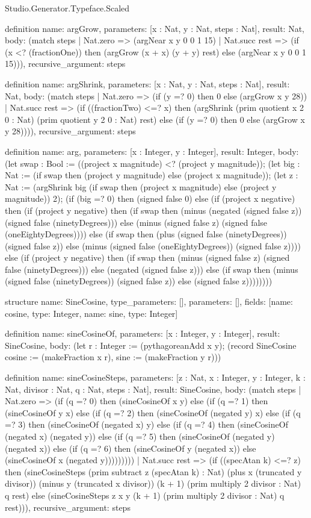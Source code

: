 \begin{lexlean}{Studio.Generator.Typeface.Scaled}
\begin{semanticmodule}
definition{
  name: argGrow,
  parameters: [x : Nat, y : Nat, steps : Nat],
  result: Nat,
  body: (match steps
    | Nat.zero => (argNear x y 0 0 1 15)
    | Nat.succ rest => (if (x <? (fractionOne)) then (argGrow (x + x) (y + y) rest) else (argNear x y 0 0 1 15))),
  recursive_argument: steps
}

definition{
  name: argShrink,
  parameters: [x : Nat, y : Nat, steps : Nat],
  result: Nat,
  body: (match steps
    | Nat.zero => (if (y =? 0) then 0 else (argGrow x y 28))
    | Nat.succ rest => (if ((fractionTwo) <=? x) then (argShrink (prim quotient x 2 0 : Nat) (prim quotient y 2 0 : Nat) rest) else (if (y =? 0) then 0 else (argGrow x y 28)))),
  recursive_argument: steps
}

definition{
  name: arg,
  parameters: [x : Integer, y : Integer],
  result: Integer,
  body: (let swap : Bool := ((project x magnitude) <? (project y magnitude)); (let big : Nat := (if swap then (project y magnitude) else (project x magnitude)); (let z : Nat := (argShrink big (if swap then (project x magnitude) else (project y magnitude)) 2); (if (big =? 0) then (signed false 0) else (if (project x negative) then (if (project y negative) then (if swap then (minus (negated (signed false z)) (signed false (ninetyDegrees))) else (minus (signed false z) (signed false (oneEightyDegrees)))) else (if swap then (plus (signed false (ninetyDegrees)) (signed false z)) else (minus (signed false (oneEightyDegrees)) (signed false z)))) else (if (project y negative) then (if swap then (minus (signed false z) (signed false (ninetyDegrees))) else (negated (signed false z))) else (if swap then (minus (signed false (ninetyDegrees)) (signed false z)) else (signed false z))))))))
}

structure{
  name: SineCosine,
  type_parameters: [],
  parameters: [],
  fields: [{name: cosine, type: Integer}, {name: sine, type: Integer}]
}

definition{
  name: sineCosineOf,
  parameters: [x : Integer, y : Integer],
  result: SineCosine,
  body: (let r : Integer := (pythagoreanAdd x y); (record SineCosine {cosine := (makeFraction x r), sine := (makeFraction y r)}))
}

definition{
  name: sineCosineSteps,
  parameters: [z : Nat, x : Integer, y : Integer, k : Nat, divisor : Nat, q : Nat, steps : Nat],
  result: SineCosine,
  body: (match steps
    | Nat.zero => (if (q =? 0) then (sineCosineOf x y) else (if (q =? 1) then (sineCosineOf y x) else (if (q =? 2) then (sineCosineOf (negated y) x) else (if (q =? 3) then (sineCosineOf (negated x) y) else (if (q =? 4) then (sineCosineOf (negated x) (negated y)) else (if (q =? 5) then (sineCosineOf (negated y) (negated x)) else (if (q =? 6) then (sineCosineOf y (negated x)) else (sineCosineOf x (negated y)))))))))
    | Nat.succ rest => (if ((specAtan k) <=? z) then (sineCosineSteps (prim subtract z (specAtan k) : Nat) (plus x (truncated y divisor)) (minus y (truncated x divisor)) (k + 1) (prim multiply 2 divisor : Nat) q rest) else (sineCosineSteps z x y (k + 1) (prim multiply 2 divisor : Nat) q rest))),
  recursive_argument: steps
}


\end{semanticmodule}
\end{lexlean}
